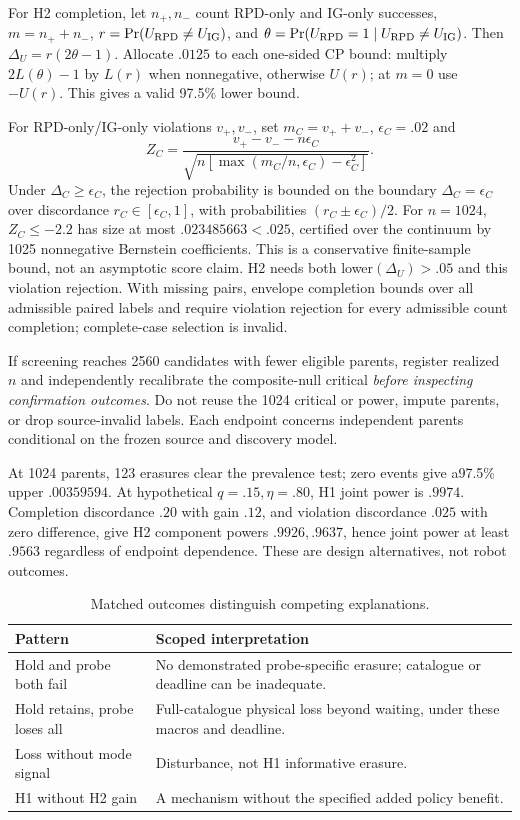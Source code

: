For H2 completion, let $n_+,n_-$ count RPD-only and IG-only successes, $m=n_++n_-$, $r=\Pr(U_{\rm RPD}\ne U_{\rm IG})$, and $\theta=\Pr(U_{\rm RPD}=1\mid U_{\rm RPD}\ne U_{\rm IG})$. Then $\Delta_U=r(2\theta-1)$. Allocate $.0125$ to each one-sided CP bound: multiply $2L(\theta)-1$ by $L(r)$ when nonnegative, otherwise $U(r)$; at $m=0$ use $-U(r)$. This gives a valid 97.5\% lower bound.

For RPD-only/IG-only violations $v_+,v_-$, set $m_C=v_++v_-$, $\epsilon_C=.02$ and
\begin{equation}
 Z_C=\frac{v_+-v_--n\epsilon_C}{\sqrt{n[\max(m_C/n,\epsilon_C)-\epsilon_C^2]}}.
\end{equation}
Under $\Delta_C\ge\epsilon_C$, the rejection probability is bounded on the boundary $\Delta_C=\epsilon_C$ over discordance $r_C\in[\epsilon_C, 1]$, with probabilities $(r_C\pm\epsilon_C)/2$. For $n=1024$, $Z_C\le-2.2$ has size at most $.023485663<.025$, certified over the continuum by 1025 nonnegative Bernstein coefficients. This is a conservative finite-sample bound, not an asymptotic score claim. H2 needs both lower$(\Delta_U)>.05$ and this violation rejection. With missing pairs, envelope completion bounds over all admissible paired labels and require violation rejection for every admissible count completion; complete-case selection is invalid.

If screening reaches 2560 candidates with fewer eligible parents, register realized $n$ and independently recalibrate the composite-null critical \emph{before inspecting confirmation outcomes}. Do not reuse the 1024 critical or power, impute parents, or drop source-invalid labels. Each endpoint concerns independent parents conditional on the frozen source and discovery model.

At 1024 parents, 123 erasures clear the prevalence test; zero events give a97.5\% upper $.00359594$. At hypothetical $q=.15,\eta=.80$, H1 joint power is $.9974$. Completion discordance $.20$ with gain $.12$, and violation discordance $.025$ with zero difference, give H2 component powers $.9926,.9637$, hence joint power at least $.9563$ regardless of endpoint dependence. These are design alternatives, not robot outcomes.

\begin{table}[t]\centering
\caption{Matched outcomes distinguish competing explanations.}\label{tab:controls}
\begin{tabular}{p{}p{}}\toprule
Pattern & Scoped interpretation\\\midrule
Hold and probe both fail & No demonstrated probe-specific erasure; catalogue or deadline can be inadequate.\\
Hold retains, probe loses all & Full-catalogue physical loss beyond waiting, under these macros and deadline.\\
Loss without mode signal & Disturbance, not H1 informative erasure.\\
H1 without H2 gain & A mechanism without the specified added policy benefit.\\\bottomrule
\end{tabular}
\end{table}


